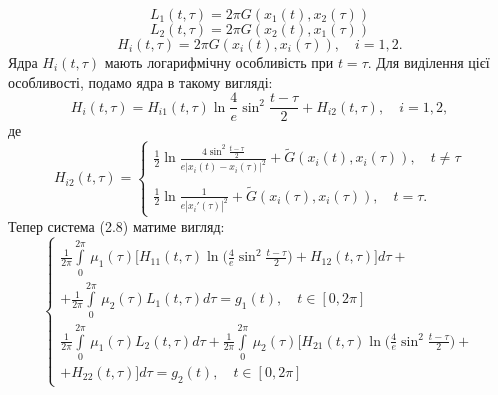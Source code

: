 \documentclass[a4 paper,12pt,ukrainian]{report}
\begin{document}
\begin{equation*}
L_{1}(t,\tau)=2\pi G(x_1(t),x_2(\tau))
\end{equation*}
\begin{equation*}
L_{2}(t,\tau)=2\pi G(x_2(t),x_1(\tau))
\end{equation*}
\begin{equation*}
H_{i}(t,\tau)=2\pi G(x_i(t),x_i(\tau)), \quad i=1,2.
\end{equation*}
\hspace*{\parindent}Ядра $H_{i}(t,\tau)$ мають логарифмічну особливість при $t=\tau$. Для виділення цієї особливості, подамо ядра в такому вигляді:
\begin{equation*}
H_{i}(t,\tau)=H_{i1}(t,\tau)\ln{\frac{4}{e}\sin^2\frac{t-\tau}{2}}+H_{i2}(t,\tau), \quad i=1,2,
\end{equation*}
де
\begin{equation*}
H_{i2}(t,\tau)=\left\{
\begin{array}{l}
\displaystyle
\frac{1}{2}\ln{\frac{4\sin^2\frac{t-\tau}{2}}{e|x_{i}(t)-x_{i}(\tau)|^2}}+\tilde{G}(x_{i}(t),x_{i}(\tau)), \quad t\neq\tau\\ \\
\displaystyle
\frac{1}{2}\ln{\frac{1}{e|x_{i}'(\tau)|^2}}+\tilde{G}(x_{i}(\tau),x_{i}(\tau)), \quad t=\tau.
\end{array}
\right.
\end{equation*}
\hspace*{\parindent}Тепер система (2.8) матиме вигляд:
\begin{equation}
\left\{
\begin{array}{c}
\displaystyle
\frac{1}{2\pi}\int\limits_{0}^{2\pi} \,\mu_1(\tau)\Big[H_{11}(t,\tau)\ln{\Big(\frac{4}{e}\sin^2\frac{t-\tau}{2}\Big)}+H_{12}(t,\tau)\Big]d\tau+\\
\displaystyle
+\frac{1}{2\pi}\int\limits_{0}^{2\pi} \,\mu_2(\tau)L_{1}(t,\tau)d\tau=g_1(t),\quad  t \in [0, 2\pi]\\
\displaystyle
\frac{1}{2\pi}\int\limits_{0}^{2\pi} \,\mu_1(\tau)L_{2}(t,\tau)d\tau+\frac{1}{2\pi}\int\limits_{0}^{2\pi} \,\mu_2 (\tau)\Big[H_{21}(t,\tau)\ln{\Big(\frac{4}{e}\sin^2\frac{t-\tau}{2}\Big)}+\\
\displaystyle
+H_{22}(t,\tau)\Big]d\tau=g_2(t),\quad  t \in [0, 2\pi]
\end{array}
\right.
\end{equation}
\end{document}
